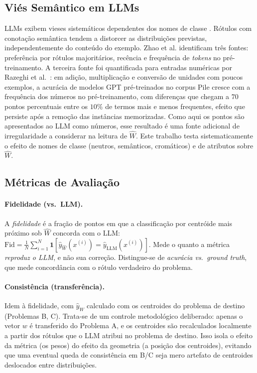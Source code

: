 \documentclass[12pt,a4paper]{article}
\newcommand{\West}{\ensuremath{\hat{W}}}   %
\begin{document}
\subsection{Viés Semântico em LLMs}

LLMs exibem vieses sistemáticos dependentes dos nomes de classe
\cite{zhaoCalibrateBefore2021}. Rótulos com conotação semântica tendem a distorcer as
distribuições previstas, independentemente do conteúdo do exemplo. Zhao et al. identificam
três fontes: preferência por rótulos majoritários, recência e frequência de \emph{tokens}
no pré-treinamento. A terceira fonte foi quantificada para entradas numéricas por Razeghi
et al.~\cite{razeghiImpactPretraining2022}: em adição, multiplicação e conversão de
unidades com poucos exemplos, a acurácia de modelos GPT pré-treinados no corpus Pile
cresce com a frequência dos números no pré-treinamento, com diferenças que chegam a $70$
pontos percentuais entre os $10\%$ de termos mais e menos frequentes, efeito que persiste
após a remoção das instâncias memorizadas. Como aqui os pontos são apresentados ao LLM
como números, esse resultado é uma fonte adicional de irregularidade a considerar na
leitura de \West{}. Este trabalho testa sistematicamente o efeito de nomes de classe
(neutros, semânticos, cromáticos) e de atributos sobre \West{}.

\subsection{Métricas de Avaliação}
\label{sec:metricas}

\paragraph{Fidelidade (vs.\ LLM).}
A \emph{fidelidade} é a fração de pontos em que a classificação por centróide mais próximo sob
\West{} concorda com o LLM: $\text{Fid} = \frac{1}{N}\sum_{i=1}^N
\mathbf{1}[\hat{y}_{\West}(x^{(i)}) = \hat{y}_{\text{LLM}}(x^{(i)})]$. Mede o quanto a
métrica \emph{reproduz o LLM}, e não sua correção. Distingue-se de \emph{acurácia vs.\
ground truth}, que mede concordância com o rótulo verdadeiro do problema.

\paragraph{Consistência (transferência).}
Idem à fidelidade, com $\hat{y}_{\West}$ calculado com os centroides do problema de destino
(Problemas B, C). Trata-se de um controle metodológico deliberado: apenas o vetor $w$ é
transferido do Problema A, e os centroides são recalculados localmente a partir dos rótulos
que o LLM atribui no problema de destino. Isso isola o efeito da métrica (os pesos) do
efeito da geometria (a posição dos centroides), evitando que uma eventual queda de
consistência em B/C seja mero artefato de centroides deslocados entre distribuições.
\end{document}
